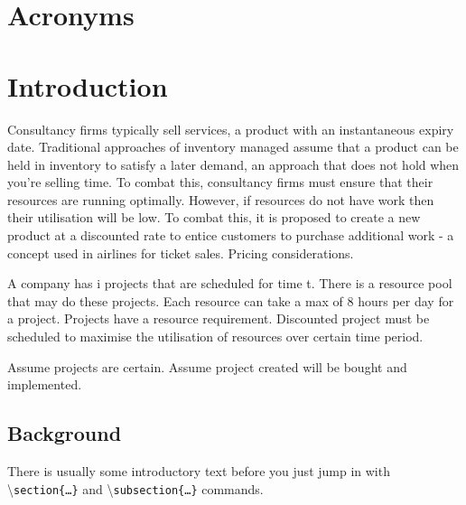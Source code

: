 \documentclass[a4paper,11pt,fleqn]{report}
\begin{document}



\tableofcontents
\listoffigures{}
\listoftables{}

\chapter*{Acronyms}
\begin{acronym}[ABCDEF]
\end{acronym}

\chapter{Introduction}
\setcounter{page}{1}
\acresetall
Consultancy firms typically sell services, a product with an instantaneous expiry date. Traditional approaches of inventory managed assume that a product can be held in inventory to satisfy a later demand, an approach that does not hold when you're selling time. To combat this, consultancy firms must ensure that their resources are running optimally. However, if resources do not have work then their utilisation will be low. To combat this, it is proposed to create a new product at a discounted rate to entice customers to purchase additional work - a concept used in airlines for ticket sales.	
Pricing considerations.



A company has i projects that are scheduled for time t. There is a resource pool that may do these projects. Each resource can take a max of 8 hours per day for a project. Projects have a resource requirement. Discounted project must be scheduled to maximise the utilisation of resources over certain time period.

Assume projects are certain. Assume project created will be bought and implemented.

\section{Background}

There is usually some introductory text before you just jump in with \textbackslash\texttt{section\{\ldots\}} and \textbackslash\texttt{subsection\{\ldots\}} commands.
\end{document}
